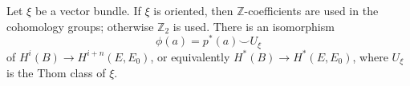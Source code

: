 Let $\xi$ be a vector bundle. If $\xi$ is oriented, then $\mathbb{Z}$-coefficients are used in the cohomology groups; otherwise $\mathbb{Z}_2$ is used. There is an isomorphism
$$\phi(a) = p^*(a) \smile U_\xi$$
of $H^i(B) \to H^{i+n}(E, E_0)$, or equivalently $H^*(B) \to H^*(E, E_0)$, where $U_\xi$ is the Thom class of $\xi$.
